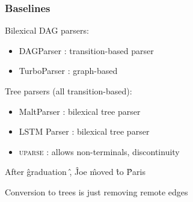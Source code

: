 \documentclass[t]{beamer}
\begin{document}
\begin{frame}
\frametitle{Baselines}
Bilexical DAG parsers:
\begin{itemize}
 \item DAGParser \cite{ribeyre-villemontedelaclergerie-seddah:2014:SemEval}:
 transition-based parser
 \item TurboParser \cite{almeida-martins:2015:SemEval}:
 graph-based
\end{itemize}

Tree parsers (all transition-based):
\begin{itemize}
 \item MaltParser \cite{nivre2007maltparser}: bilexical tree parser
 \item LSTM Parser \cite{dyer2015transition}: bilexical tree parser
 \item \textsc{uparse} \cite{maier2015discontinuous}: allows non-terminals, discontinuity
\end{itemize}

\begin{center}
	\begin{dependency}[theme = simple]
	\begin{deptext}[column sep=.7em,ampersand replacement=\^,font=\rmfamily]
	After \^ graduation \^ , \^ Joe \^ moved \^ to \^ Paris \\
	\end{deptext}
	\end{dependency}
\end{center}

\vfill
Conversion to trees is just removing remote edges
\end{frame}
\end{document}
